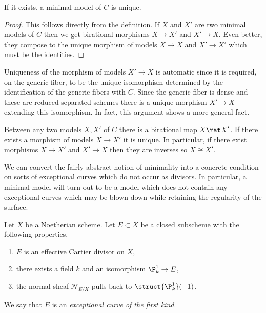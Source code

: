 \begin{lemma}
If it exists, a minimal model of $C$ is unique.
\end{lemma}

\begin{proof}
This follows directly from the definition. If $X$ and $X'$ are two minimal models of $C$ then we get birational morphisms $X \to X'$ and $X' \to X$. Even better, they compose to the unique morphism of models $X \to X$ and $X' \to X'$ which must be the identities.
\end{proof}

\begin{rmk}
Uniqueness of the morphism of models $X' \to X$ is automatic since it is required, on the generic fiber, to be the unique isomorphism determined by the identification of the generic fibers with $C$. Since the generic fiber is dense and these are reduced separated schemes there is a unique morphism $X' \to X$ extending this isomorphism. In fact, this argument shows a more general fact.
\end{rmk}

\begin{lemma} \label{existence_inverses}
Between any two models $X, X'$ of $C$ there is a birational map $X \rat X'$. If there exists a morphism of models $X \to X'$ it is unique. In particular, if there exist morphisms $X \to X'$ and $X' \to X$ then they are inverses so $X \cong X'$. 
\end{lemma}
\noindent
We can convert the fairly abstract notion of minimality into a concrete condition on sorts of exceptional curves which do not occur as divisors. In particular, a minimal model will turn out to be a model which does not contain any exceptional curves which may be blown down while retaining the regularity of the surface.

\begin{definition}
Let $X$ be a Noetherian scheme. Let $E \subset X$ be a closed subscheme with the following properties,
\begin{enumerate}
\item $E$ is an effective Cartier divisor on $X$,
\item there exists a field $k$ and an isomorphism $\P^1_k \to E$,
\item the normal sheaf $\mathcal{N}_{E/X}$ pulls back to $\struct{\P^1_k}(-1)$. 
\end{enumerate}
We say that $E$ is an \textit{exceptional curve of the first kind}.
\end{definition}

